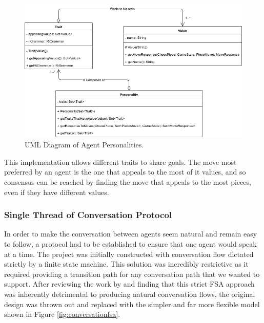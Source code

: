 \documentclass[conference]{IEEEtran}
\begin{document}
\begin{figure}[!h]
	\centering
	\includegraphics[width=\linewidth]{images/personality}
	\caption{UML Diagram of Agent Personalities.}
	\label{fig:personalityuml}
\end{figure}

This implementation allows different traits to share goals. The move most preferred by an agent is the one that appeals to the most of it values, and so consensus can be reached by finding the move that appeals to the most pieces, even if they have different values.

\subsubsection{Single Thread of Conversation Protocol}

In order to make the conversation between agents seem natural and remain easy to follow, a protocol had to be established to ensure that one agent would speak at a time. The project was initially constructed with conversation flow dictated strictly by a finite state machine. This solution was incredibly restrictive as it required providing a transition path for any conversation path that we wanted to support. After reviewing the work by \cite{tartan} and finding that this strict FSA approach was inherently detrimental to producing natural conversation flows, the original design was thrown out and replaced with the simpler and far more flexible model shown in Figure \ref{fig:conversationfsa}.
\end{document}
